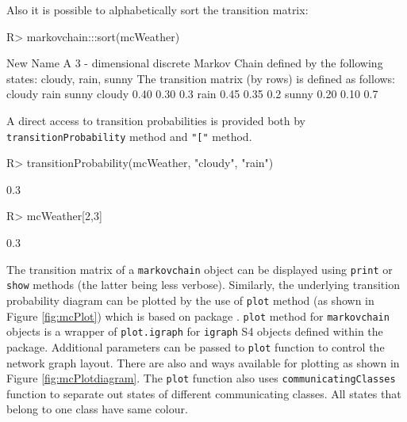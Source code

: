 \documentclass[
  nojss]{jss}
\begin{document}
Also it is possible to alphabetically sort the transition matrix:

\begin{CodeChunk}

\begin{CodeInput}
R> markovchain:::sort(mcWeather)
\end{CodeInput}

\begin{CodeOutput}
New Name 
 A  3 - dimensional discrete Markov Chain defined by the following states: 
 cloudy, rain, sunny 
 The transition matrix  (by rows)  is defined as follows: 
       cloudy rain sunny
cloudy   0.40 0.30   0.3
rain     0.45 0.35   0.2
sunny    0.20 0.10   0.7
\end{CodeOutput}
\end{CodeChunk}

A direct access to transition probabilities is provided both by \texttt{transitionProbability} method and \texttt{"{[}"} method.

\begin{CodeChunk}

\begin{CodeInput}
R> transitionProbability(mcWeather, "cloudy", "rain")
\end{CodeInput}

\begin{CodeOutput}
[1] 0.3
\end{CodeOutput}

\begin{CodeInput}
R> mcWeather[2,3]
\end{CodeInput}

\begin{CodeOutput}
[1] 0.3
\end{CodeOutput}
\end{CodeChunk}

The transition matrix of a \texttt{markovchain} object can be displayed using \texttt{print} or \texttt{show} methods (the latter being less verbose). Similarly, the underlying transition probability diagram can be plotted by the use of \texttt{plot} method (as shown in Figure \ref{fig:mcPlot}) which is based on  package \citep{pkg:igraph}. \texttt{plot} method for \texttt{markovchain} objects is a wrapper of \texttt{plot.igraph} for \texttt{igraph} S4 objects defined within the  package. Additional parameters can be passed to \texttt{plot} function to control the network graph layout. There are also  and  ways available for plotting as shown in Figure \ref{fig:mcPlotdiagram}. The \texttt{plot} function also uses \texttt{communicatingClasses} function to separate out states of different communicating classes. All states that belong to one class have same colour.
\end{document}
